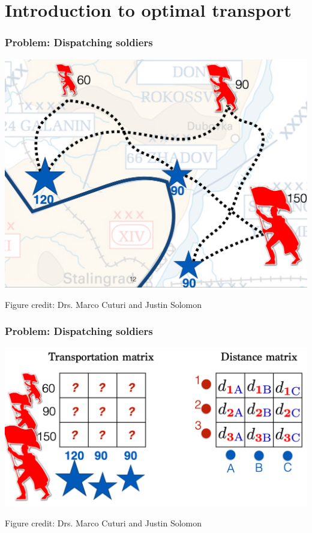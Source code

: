 \documentclass[mathserif,compress,xcolor={dvipsnames}]{beamer}
\renewcommand\;{\,}
\begin{document}
\section{Introduction to optimal transport}



\begin{frame}\frametitle{Problem: Dispatching soldiers}
\begin{center}
\includegraphics[width=0.8\linewidth]{Images/soldiers.png}
\end{center}
{\scriptsize * Figure credit: Drs. Marco Cuturi and Justin Solomon}
\end{frame}

\begin{frame}\frametitle{Problem: Dispatching soldiers}
\begin{center}
\includegraphics[width=0.8\linewidth]{Images/soldiers_as_OT.png}
\end{center}
{\scriptsize * Figure credit: Drs. Marco Cuturi and Justin Solomon}
\end{frame}
\end{document}

